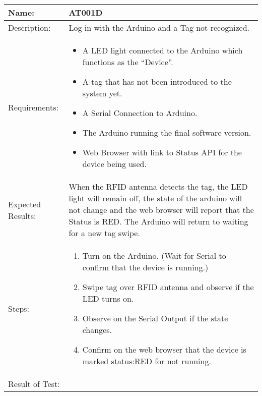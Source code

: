 \begin{table}[h]
	\centering
		\begin{tabular*}{\textwidth}{|l|l|}
		\hline
		\hline
		Name: & AT001D\\
		\hline
		Description: & Log in with the Arduino and a Tag not recognized.\\
		\hline
		Requirements: &
		\parbox{0.85\textwidth}{
		\begin{itemize}
		  \item A LED light connected to the Arduino which functions as the ``Device''.
			\item A tag that has not been introduced to the system yet.
			\item A Serial Connection to Arduino.
			\item The Arduino running the final software version.
			\item Web Browser with link to Status API for the device being used.
		\end{itemize}}\\
				\hline
		Expected Results: & \parbox{.85\textwidth}{When the RFID antenna detects the tag, the LED light will remain off, the state of the arduino will not change and the web browser will report that the Status is RED.		
		The Arduino will return to waiting for a new tag swipe.}\\
		\hline
		Steps: & \parbox{.85\textwidth}{
		\begin{enumerate}
			\item Turn on the Arduino. (Wait for Serial to confirm that the device is running.)
			\item Swipe tag over RFID antenna and observe if the LED turns on.
			\item Observe on the Serial Output if the state changes.
			\item Confirm on the web browser that the device is marked status:RED for not running.
		\end{enumerate}}
		\\
		\hline
		Result of Test: & \\
		\hline
		\end{tabular*}
\end{table}

